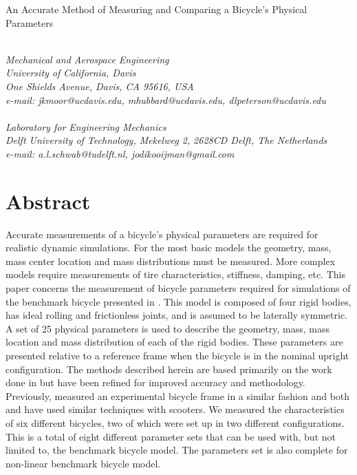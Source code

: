 \documentclass{bmd2010a}
\begin{document}
\begin{flushleft}
{\fontsize{16pt}{20pt}\selectfont%
  An Accurate Method of Measuring and Comparing a Bicycle's Physical Parameters\\}
\end{flushleft}

\begin{flushleft}
  {\\}
  \textit{Mechanical and Aerospace Engineering\\
          University of California, Davis\\
          One Shields Avenue, Davis, CA 95616, USA\\
          e-mail: jkmoor@ucdavis.edu, mhubbard@ucdavis.edu,
          dlpeterson@ucdavis.edu
  }\vspace{10pt}\\
  {\\}
  \textit{Laboratory for Engineering Mechanics\\
          Delft University of Technology, Mekelweg 2, 2628CD Delft, The
          Netherlands\\
          e-mail: a.l.schwab@tudelft.nl, jodikooijman@gmail.com
  }\vspace{10pt}\\
\end{flushleft}

\section*{Abstract}
Accurate measurements of a bicycle's physical parameters are required for
realistic dynamic simulations. For the most basic models the geometry, mass,
mass center location and mass distributions must be measured. More complex models
require measurements of tire characteristics, stiffness, damping, etc. This
paper concerns the measurement of bicycle parameters required for
simulations of the benchmark bicycle presented in \cite{Meijaard2007}. This
model is composed of four rigid bodies, has ideal rolling and frictionless joints,
and is assumed to be laterally symmetric. A set of 25
physical parameters is used to describe the geometry, mass, mass location and
mass distribution of each of the rigid bodies. These parameters are presented
relative to a reference frame when the bicycle is in the nominal upright
configuration. The methods described herein are based primarily on the work
done in \cite{Kooijman2006} but have been refined for improved accuracy and
methodology. Previously, \cite{Roland1971} measured an experimental bicycle frame in a
similar fashion and both \cite{Dohring1953} and \cite{Singh1971} have used
similar techniques with scooters. We measured the characteristics of six
different bicycles, two of which were set up in two different configurations.
This is a total of eight different parameter sets that can be used with, but not
limited to, the benchmark bicycle model. The parameters set is also complete
for non-linear benchmark bicycle model.
\end{document}
